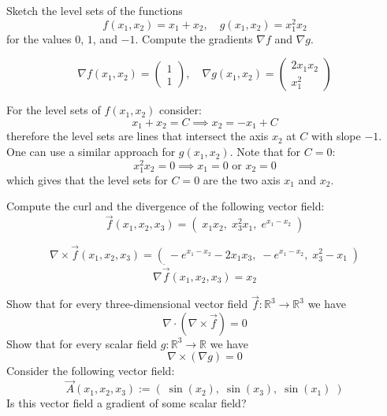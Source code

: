 \documentclass[11pt]{article}
\begin{document}
\def\hidesolutions{}


\begin{exercise}
	Sketch the level sets of the functions 
    \[
        f(x_1,x_2) = x_1 + x_2, \quad g(x_1,x_2) = x_1^2 x_2 
    \]
    for the values $0$, $1$, and $-1$.
    Compute the gradients $\nabla f$ and  $\nabla g$.
\end{exercise}

\begin{solution}
    \[
        \nabla f(x_1,x_2) = \begin{pmatrix} 1\\ 1 \end{pmatrix}, \quad \nabla g(x_1,x_2) =  \begin{pmatrix} 2x_1x_2\\ x_1^2 \end{pmatrix}
    \]


For the level sets of $f(x_1,x_2)$ consider:
    \[
        x_1 + x_2 = C \implies x_2 = -x_1 + C
    \]
therefore the level sets are lines that intersect the axis $x_2$ at $C$ with slope $-1$. One can use a similar approach for $g(x_1,x_2)$. Note that for $C =0$:
    \[
        x_1^2 x_2 = 0 \implies x_1 =0 \text{ or } x_2 = 0
    \]
which gives that the level sets for $C = 0$ are the two axis $x_1$ and $x_2$. 
\end{solution}


\begin{exercise}
	Compute the curl and the divergence of the following vector field:
    \[
        \vec{f}(x_1,x_2,x_3) = \left( \; x_1 x_2, \; x_3^2 x_1,\;  e^{x_1 - x_2} \; \right)
    \]
\end{exercise}

\begin{solution}
    \[
        \nabla \times \vec{f}(x_1,x_2,x_3) = \left( \; -e^{x_1-x_2} - 2x_1x_3, \; -e^{x_1-x_2},\;  x_3^2 - x_1 \; \right)
    \]
   \[
        \nabla \dot \vec{f}(x_1,x_2,x_3) = x_2
    \]
\end{solution}





\begin{exercise}
	Show that for every three-dimensional vector field $\vec{f} \colon \mathbb{R}^3 \to \mathbb{R}^3$ we have 
    \[
        \nabla \cdot \left( \nabla \times \vec{f} \right) = 0
    \]
    Show that for every scalar field $g \colon \mathbb{R}^3 \to \mathbb{R}$ we have 
    \[
        \nabla \times \left( \nabla g \right) = 0
    \]
    Consider the following vector field:
    \[
        \vec{A}(x_1,x_2,x_3) := \left( \; \sin(x_2),  \; \sin(x_3), \; \sin(x_1) \; \right)
    \]
    Is this vector field a gradient of some scalar field?
\end{exercise}
\end{document}
